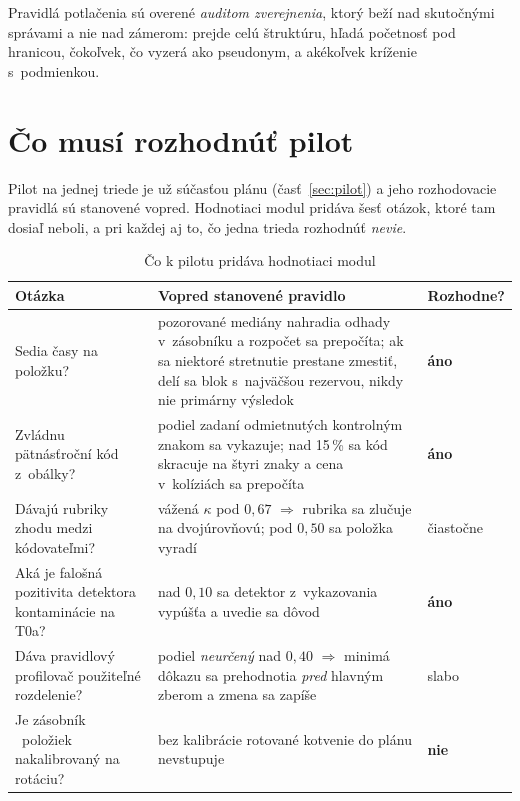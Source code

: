 Pravidlá potlačenia sú overené \emph{auditom zverejnenia}, ktorý beží nad
skutočnými správami a nie nad zámerom: prejde celú štruktúru, hľadá početnosť pod
hranicou, čokoľvek, čo vyzerá ako pseudonym, a akékoľvek kríženie s~podmienkou.

\section{Čo musí rozhodnúť pilot}
\label{sec:modul-pilot}

Pilot na jednej triede je už súčasťou plánu (časť~\ref{sec:pilot}) a jeho
rozhodovacie pravidlá sú stanovené vopred. Hodnotiaci modul pridáva šesť otázok,
ktoré tam dosiaľ neboli, a pri každej aj to, čo jedna trieda rozhodnúť
\emph{nevie}.

\begin{table}[H]
\centering
\caption{Čo k pilotu pridáva hodnotiaci modul}
\label{tab:pilot-modul}
\scriptsize
\begin{tabularx}{\textwidth}{@{}X X l@{}}
\toprule
\textbf{Otázka} & \textbf{Vopred stanovené pravidlo} & \textbf{Rozhodne?} \\
\midrule
Sedia časy na položku?
& pozorované mediány nahradia odhady v~zásobníku a rozpočet sa prepočíta; ak sa niektoré stretnutie prestane zmestiť, delí sa blok s~najväčšou rezervou, nikdy nie primárny výsledok
& \textbf{áno} \\
Zvládnu pätnásťroční kód z~obálky?
& podiel zadaní odmietnutých kontrolným znakom sa vykazuje; nad 15\,\% sa kód skracuje na štyri znaky a cena v~kolíziách sa prepočíta
& \textbf{áno} \\
Dávajú rubriky zhodu medzi kódovateľmi?
& vážená $\kappa$ pod $0{,}67$ $\Rightarrow$ rubrika sa zlučuje na dvojúrovňovú; pod $0{,}50$ sa položka vyradí
& čiastočne \\
Aká je falošná pozitivita detektora kontaminácie na T0a?
& nad $0{,}10$ sa detektor z~vykazovania vypúšťa a uvedie sa dôvod
& \textbf{áno} \\
Dáva pravidlový profilovač použiteľné rozdelenie?
& podiel \emph{neurčený} nad $0{,}40$ $\Rightarrow$ minimá dôkazu sa prehodnotia \emph{pred} hlavným zberom a zmena sa zapíše
& slabo \\
Je zásobník \asmRotPool{}~položiek nakalibrovaný na rotáciu?
& bez kalibrácie rotované kotvenie do plánu nevstupuje
& \textbf{nie} \\
\bottomrule
\end{tabularx}
\end{table}

